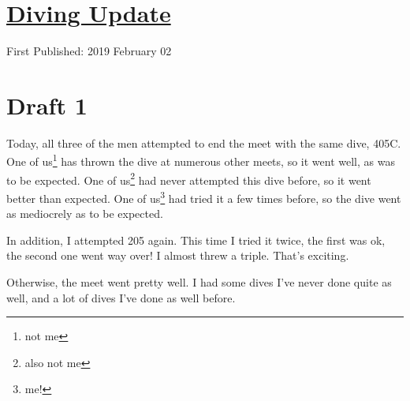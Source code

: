 \documentclass[12pt]{article}[titlepage]
\newcommand{\1}{\={a}}
\newcommand{\2}{\={e}}
\newcommand{\3}{\={\i}}
\newcommand{\4}{\=o}
\newcommand{\5}{\=u}
\newcommand{\6}{\={A}}
\renewcommand{\,}{\textsuperscript{,}}
\begin{document}
\doublespacing
\section{\href{diving-2-feb.html}{Diving Update}}
First Published: 2019 February 02
\section{Draft 1}
Today, all three of the men attempted to end the meet with the same dive, 405C.
One of us\footnote{not me} has thrown the dive at numerous other meets, so it went well, as was to be expected.
One of us\footnote{also not me} had never attempted this dive before, so it went better than expected.
One of us\footnote{me!} had tried it a few times before, so the dive went as mediocrely as to be expected.

In addition, I attempted 205 again.
This time I tried it twice, the first was ok, the second one went way over!
I almost threw a triple.
That's exciting.

Otherwise, the meet went pretty well.
I had some dives I've never done quite as well, and a lot of dives I've done as well before.
\end{document}
